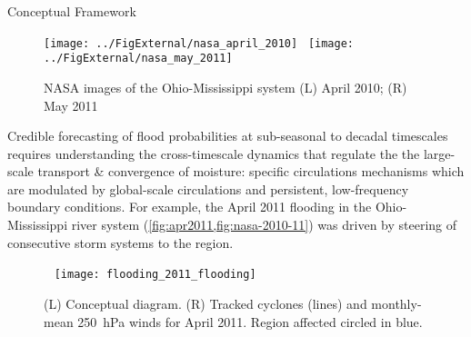 \begin{block}{Conceptual Framework}
    \begin{figure}
        \caption{NASA images of the Ohio-Mississippi system (L) April 2010; (R) May 2011}
        \texttt{[image: ../FigExternal/nasa\_april\_2010]}~
        \texttt{[image: ../FigExternal/nasa\_may\_2011]}
        \label{fig:nasa-2010-11}
    \end{figure}
    Credible forecasting of flood probabilities at sub-seasonal to decadal timescales \cite{Merz2014} requires understanding the cross-timescale dynamics that regulate the the large-scale transport \& convergence of moisture: specific circulations mechanisms which are modulated by global-scale circulations and persistent, low-frequency boundary conditions.
    For example, the April 2011 flooding in the Ohio-Mississippi river system (\cref{fig:apr2011,fig:nasa-2010-11}) was driven by steering of consecutive storm systems to the region.
    \begin{figure}
        ~\hfill
        \texttt{[image: flooding\_2011\_flooding]}
        \caption{(L) Conceptual diagram. (R) Tracked cyclones (lines) and monthly-mean \SI{250}{\hecto\pascal} winds for April 2011. Region affected circled in blue.}
        \label{fig:apr2011}
    \end{figure}
\end{block}
